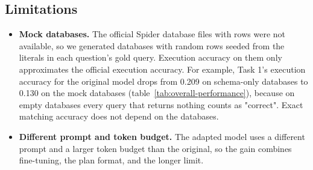 \subsection{Limitations}
\label{sec:rq3-limitations}

\begin{itemize}
\item \textbf{Mock databases.} The official Spider database files with rows were not available, so we generated databases with random rows seeded from the literals in each question's gold query. Execution accuracy on them only approximates the official execution accuracy. For example, Task 1's execution accuracy for the original model drops from 0.209 on schema-only databases to 0.130 on the mock databases (table~\ref{tab:overall-performance}), because on empty databases every query that returns nothing counts as "correct". Exact matching accuracy does not depend on the databases.
\item \textbf{Different prompt and token budget.} The adapted model uses a different prompt and a larger token budget than the original, so the gain combines fine-tuning, the plan format, and the longer limit.
\end{itemize}
